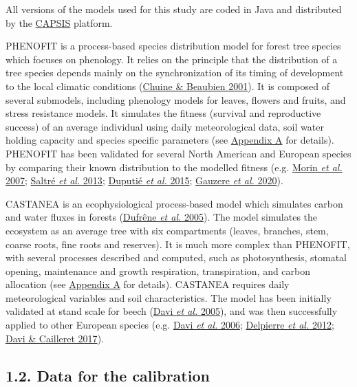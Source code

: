 \documentclass[11pt,]{article}
\begin{document}
All versions of the models used for this study are coded in Java and
distributed by the \href{https://capsis.cirad.fr/capsis/home}{CAPSIS}
platform.

PHENOFIT is a process-based species distribution model for forest tree
species which focuses on phenology. It relies on the principle that the
distribution of a tree species depends mainly on the synchronization of
its timing of development to the local climatic conditions
(\protect\hyperlink{ref-Chuine2001}{Chuine \& Beaubien 2001}). It is
composed of several submodels, including phenology models for leaves,
flowers and fruits, and stress resistance models. It simulates the
fitness (survival and reproductive success) of an average individual
using daily meteorological data, soil water holding capacity and species
specific parameters (see \protect\hyperlink{appendixA}{Appendix A} for
details). PHENOFIT has been validated for several North American and
European species by comparing their known distribution to the modelled
fitness (e.g. \protect\hyperlink{ref-Morin2007}{Morin \emph{et al.}
2007}; \protect\hyperlink{ref-Saltre2013}{Saltré \emph{et al.} 2013};
\protect\hyperlink{ref-Duputie2015}{Duputié \emph{et al.} 2015};
\protect\hyperlink{ref-Gauzere2020}{Gauzere \emph{et al.} 2020}).

CASTANEA is an ecophysiological process-based model which simulates
carbon and water fluxes in forests
(\protect\hyperlink{ref-Dufrene2005}{Dufrêne \emph{et al.} 2005}). The
model simulates the ecosystem as an average tree with six compartments
(leaves, branches, stem, coarse roots, fine roots and reserves). It is
much more complex than PHENOFIT, with several processes described and
computed, such as photosynthesis, stomatal opening, maintenance and
growth respiration, transpiration, and carbon allocation (see
\protect\hyperlink{appendixA}{Appendix A} for details). CASTANEA
requires daily meteorological variables and soil characteristics. The
model has been initially validated at stand scale for beech
(\protect\hyperlink{ref-Davi2005}{Davi \emph{et al.} 2005}), and was
then successfully applied to other European species (e.g.
\protect\hyperlink{ref-Davi2006}{Davi \emph{et al.} 2006};
\protect\hyperlink{ref-Delpierre2012}{Delpierre \emph{et al.} 2012};
\protect\hyperlink{ref-Davi2017}{Davi \& Cailleret 2017}).

\hypertarget{data}{%
\subsection{1.2. Data for the calibration}\label{data}}
\end{document}
